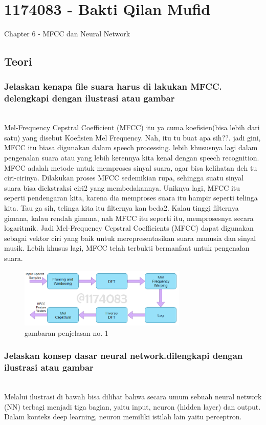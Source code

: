 \section{1174083 - Bakti Qilan Mufid}
Chapter 6 - MFCC dan Neural Network
\subsection{Teori}
\subsubsection{Jelaskan kenapa file suara harus di lakukan MFCC. delengkapi dengan ilustrasi atau gambar}
\hfill\\
Mel-Frequency Cepstral Coefficient (MFCC) itu ya cuma koefisien(bisa lebih dari satu) yang disebut Koefisien Mel Frequency. Nah, itu tu buat apa sih??. jadi gini, MFCC itu biasa digunakan dalam speech processing. lebih khususnya lagi dalam pengenalan suara atau yang lebih kerennya kita kenal dengan speech recognition. MFCC adalah metode untuk memproses sinyal suara, agar bisa kelihatan deh tu ciri-cirinya. Dilakukan proses MFCC sedemikian rupa, sehingga suatu sinyal suara bisa diekstraksi ciri2 yang membedakannya. Uniknya lagi, MFCC itu seperti pendengaran kita, karena dia memproses suara itu hampir seperti telinga kita. Tau ga sih, telinga kita itu filternya kan beda2. Kalau tinggi filternya gimana, kalau rendah gimana, nah MFCC itu seperti itu, memprosesnya secara logaritmik. Jadi Mel-Frequency Cepstral Coefficients (MFCC) dapat digunakan sebagai vektor ciri yang baik untuk merepresentasikan suara manusia dan sinyal musik. Lebih khusus lagi, MFCC telah terbukti bermanfaat untuk pengenalan suara.

\begin{figure}[H]
	\centering
	\includegraphics[width=8cm]{figures/1174083/figures6/1.png}
	\caption{gambaran penjelasan no. 1}
\end{figure}

\subsubsection{Jelaskan konsep dasar neural network.dilengkapi dengan ilustrasi atau gambar}
\hfill\\
Melalui ilustrasi di bawah bisa dilihat bahwa secara umum sebuah neural network (NN) terbagi menjadi tiga bagian, yaitu input, neuron (hidden layer) dan output. Dalam konteks deep learning, neuron memiliki istilah lain yaitu perceptron.

